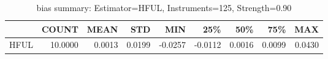 \begin{table}[ht]
\centering
\caption{bias summary: Estimator=HFUL, Instruments=125, Strength=0.90}
\begin{tabular}{lrrrrrrrr}
\toprule
 & COUNT & MEAN & STD & MIN & 25\% & 50\% & 75\% & MAX \\
\midrule
HFUL & 10.0000 & 0.0013 & 0.0199 & -0.0257 & -0.0112 & 0.0016 & 0.0099 & 0.0430 \\
\bottomrule
\end{tabular}
\end{table}
